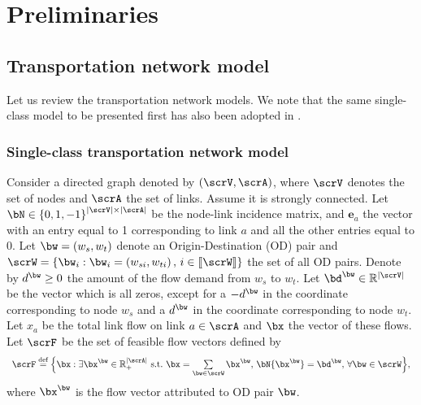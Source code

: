 \documentclass[3p]{elsarticle}
\newcommand*{\defeq}{\stackrel{\text{def}}{=}}
\begin{document}
\section{Preliminaries} \label{sec:preli}
	
\subsection{Transportation network model}  \label{sec:mod}
	
Let us review the transportation network models. We note that the same
single-class model to be presented first has also been adopted in
\cite{bertsimas2014data,CDC16,IFAC17}.
	
\subsubsection{Single-class transportation network
  model} \label{sec:sing-mod}
	
Consider a directed graph denoted by $\left( {\scrV, \scrA} \right)$,
where $\scrV$ denotes the set of nodes and $\scrA$ the set of
links. Assume it is strongly connected.  Let $\bN \in {\left\{ {0,1, -
      1} \right\}^{\left| \scrV \right| \times \left| \scrA \right|}}$
be the node-link incidence matrix, and $\textbf{e}_{a}$ the vector with
an entry equal to 1 corresponding to link $a$ and all the other entries
equal to 0.  Let $\bw = \left( {{w_s},{w_t}} \right)$ denote an
Origin-Destination (OD) pair and $\scrW = \left\{ {{\bw_i}:{\bw_i} =
    \left( {{w_{si}},{w_{ti}}} \right), \,i \in \left[\kern-0.15em\left[
        \scrW \right]\kern-0.15em\right]} \right\}$ the set of all OD
pairs.  Denote by ${d^{\bw}} \ge 0$ the amount of the flow demand from
$w_s$ to $w_t$. Let ${\bd^{\bw}} \in {\mathbb{R}^{\left| \scrV
    \right|}}$ be the vector which is all zeros, except for a
$-{d^{\bw}}$ in the coordinate corresponding to node $w_s$ and a
${d^{\bw}}$ in the coordinate corresponding to node $w_t$.  Let $x_a$ be
the total link flow on link $a \in \scrA$ and $\bx$ the vector of these
flows.  Let $\scrF$ be the set of feasible flow vectors defined by
\begin{align}
\begin{array}{l}
	\scrF \defeq \Big\{ \bx:\exists {\bx^{\bw}} \in \mathbb{R}_ +
		^{\left| \scrA \right|} ~\text{s.t.}~\bx =
		\sum\limits_{\bw \in \scrW} {{\bx^{\bw}}},\, \bN{\bx^{\bw}} = {\bd^{\bw}},\,\forall \bw \in \scrW \Big\}, 
\end{array}   \label{feasi}
\end{align}
where $\bx^\bw$ is the flow vector attributed to OD pair $\bw$.
	
\end{document}
